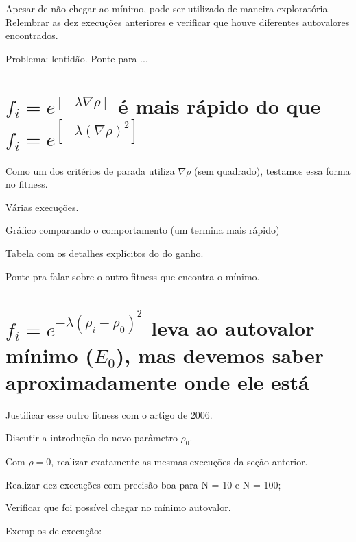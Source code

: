 	Apesar de não chegar ao mínimo, pode ser utilizado de maneira exploratória. Relembrar as dez execuções anteriores e verificar que houve diferentes autovalores encontrados.
	
	Problema: lentidão. Ponte para ...
	
	\section{$f_i = e^{[-\lambda \nabla \rho]}$ é mais rápido do que $f_i = e^{[-\lambda (\nabla \rho)^2]}$}
	
	Como um dos critérios de parada utiliza $\nabla \rho$ (sem quadrado), testamos essa forma no fitness.
	
	Várias execuções.
	
	Gráfico comparando o comportamento (um termina mais rápido)
	
	Tabela com os detalhes explícitos do do ganho.
	
	Ponte pra falar sobre o outro fitness que encontra o mínimo.
	
	\section{$f_i = e^{-\lambda(\rho_i - \rho_0)^2}$ leva ao autovalor mínimo ($E_0$), mas devemos saber aproximadamente onde ele está}
	
	Justificar esse outro fitness com o artigo de 2006.
	
	Discutir a introdução do novo parâmetro $\rho_0$.
	
	Com $\rho = 0$, realizar exatamente as mesmas execuções da seção anterior.
	
	Realizar dez execuções com precisão boa para N = 10 e N = 100;
	
	Verificar que foi possível chegar no mínimo autovalor.
	
	Exemplos de execução:
	
